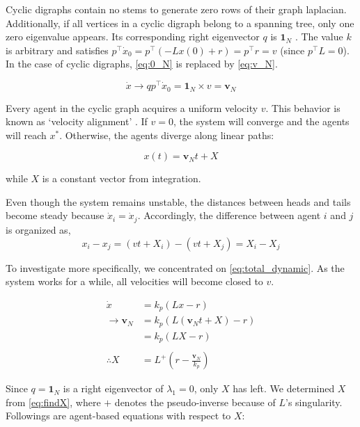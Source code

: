 \documentclass[letterpaper, 10 pt, conference]{ieeeconf}  %
\begin{document}
Cyclic digraphs contain no stems to generate zero rows of their graph laplacian. Additionally, if all vertices in a cyclic digraph belong to a spanning tree, only one zero eigenvalue appears. Its corresponding right eigenvector \( q \) is \( \mathbf{1}_N \) \cite{olfati-saber_consensus_2007}. The value \( k \) is arbitrary and satisfies \( p^\top \dot{x}_0 = p^\top (-Lx(0) + r) = p^\top r = v \) (since \( p^\top L = 0 \)). In the case of cyclic digraphs, \eqref{eq:0_N} is replaced by \eqref{eq:v_N}.

\begin{equation}\label{eq:v_N}
    \dot{x} \rightarrow qp^\top \dot{x}_0 = \mathbf{1}_N \times v = \mathbf{v}_N
\end{equation}

\noindent Every agent in the cyclic graph acquires a uniform velocity \( v \). This behavior is known as `velocity alignment' \cite{dimarogonas_connection_2008}. If \( v = 0 \), the system will converge and the agents will reach \( x^* \). Otherwise, the agents diverge along linear paths:

\[
x(t) = \mathbf{v}_N t + X 
\]

\noindent while \( X \) is a constant vector from integration.


Even though the system remains unstable, the distances between heads and tails become steady because \( \dot{x}_i = \dot{x}_j \). Accordingly, the difference between agent $i$ and $j$ is organized as,
\[
x_i - x_j = (vt + X_i) - (vt +X_j) = X_i-X_j
\]

To investigate more specifically, we concentrated on \eqref{eq:total_dynamic}. As the system works for a while, all velocities will become closed to $v$. 

\begin{equation}\label{eq:findX}
\begin{split}
    \dot{x} &= k_p(Lx - r) \\
   \rightarrow  \mathbf{v}_N &= k_p(L(\mathbf{v}_Nt + X) - r) \\
           &= k_p(LX - r)  \\ \\
 \therefore X &= L^+ (r - \frac{\mathbf{v}_N}{k_p})
\end{split}
\end{equation}

Since $q=\mathbf{1}_N$ is a right eigenvector of $\lambda_1 = 0$, only $X$ has left. We determined \( X \) from \eqref{eq:findX}, where \( + \) denotes the pseudo-inverse because of \( L \)'s singularity. Followings are agent-based equations with respect to $X$:
\end{document}
